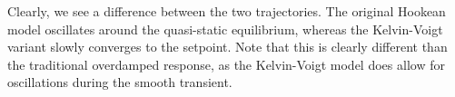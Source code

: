 \begin{example}
\begin{figure}[!t]
   \vspace{-0.1cm}
   \label{fig:C2:creep}
 \end{figure}
%
Clearly, we see a difference between the two trajectories. The original Hookean model oscillates around the quasi-static equilibrium, whereas the Kelvin-Voigt variant slowly converges to the setpoint. Note that this is clearly different than the traditional overdamped response, as the Kelvin-Voigt model does allow for oscillations during the smooth transient. %
%
\end{example}
